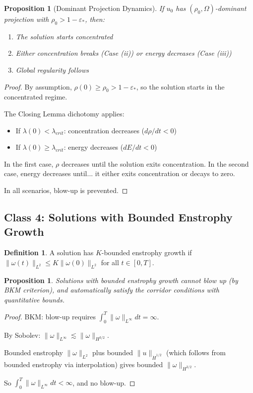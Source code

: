 \documentclass[11pt]{article}
\newtheorem{proposition}[theorem]{Proposition}
\theoremstyle{definition}
\newtheorem{definition}[theorem]{Definition}
\begin{document}
\begin{proposition}[Dominant Projection Dynamics]\label{prop:dominant}
If $u_0$ has $(\rho_0, \Omega)$-dominant projection with $\rho_0 > 1 - \varepsilon_*$, then:
\begin{enumerate}
\item The solution starts concentrated
\item Either concentration breaks (Case (ii)) or energy decreases (Case (iii))
\item Global regularity follows
\end{enumerate}
\end{proposition}

\begin{proof}
By assumption, $\rho(0) \geq \rho_0 > 1 - \varepsilon_*$, so the solution starts in the concentrated regime.

The Closing Lemma dichotomy applies:
\begin{itemize}
\item If $\lambda(0) < \lambda_{crit}$: concentration decreases ($d\rho/dt < 0$)
\item If $\lambda(0) \geq \lambda_{crit}$: energy decreases ($dE/dt < 0$)
\end{itemize}

In the first case, $\rho$ decreases until the solution exits concentration. In the second case, energy decreases until... it either exits concentration or decays to zero.

In all scenarios, blow-up is prevented.
\end{proof}

\subsection{Class 4: Solutions with Bounded Enstrophy Growth}

\begin{definition}
A solution has $K$-bounded enstrophy growth if $\|\omega(t)\|_{L^2} \leq K\|\omega(0)\|_{L^2}$ for all $t \in [0, T]$.
\end{definition}

\begin{proposition}
Solutions with bounded enstrophy growth cannot blow up (by BKM criterion), and automatically satisfy the corridor conditions with quantitative bounds.
\end{proposition}

\begin{proof}
BKM: blow-up requires $\int_0^T \|\omega\|_{L^\infty} dt = \infty$.

By Sobolev: $\|\omega\|_{L^\infty} \lesssim \|\omega\|_{H^{3/2}}$.

Bounded enstrophy $\|\omega\|_{L^2}$ plus bounded $\|u\|_{\dot{H}^{1/2}}$ (which follows from bounded enstrophy via interpolation) gives bounded $\|\omega\|_{H^{3/2}}$.

So $\int_0^T \|\omega\|_{L^\infty} dt < \infty$, and no blow-up.
\end{proof}
\end{document}
